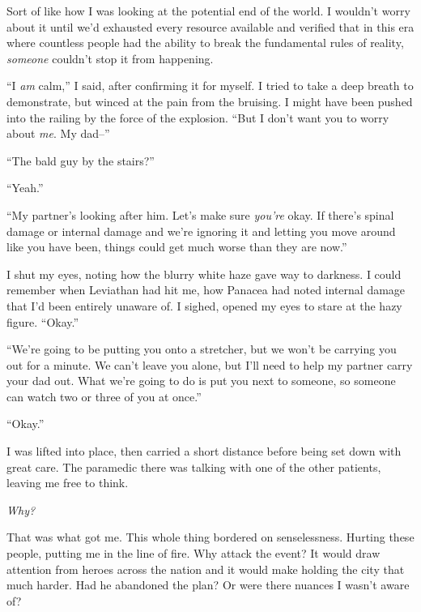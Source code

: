 Sort of like how I was looking at the potential end of the world.  I wouldn't worry about it until we'd exhausted every resource available and verified that in this era where countless people had the ability to break the fundamental rules of reality, \emph{someone} couldn't stop it from happening.



``I \emph{am} calm,'' I said, after confirming it for myself.  I tried to take a deep breath to demonstrate, but winced at the pain from the bruising.  I might have been pushed into the railing by the force of the explosion.  ``But I don't want you to worry about \emph{me}.  My dad--''



``The bald guy by the stairs?''



``Yeah.''



``My partner's looking after him.  Let's make sure \emph{you're} okay.  If there's spinal damage or internal damage and we're ignoring it and letting you move around like you have been, things could get much worse than they are now.''



I shut my eyes, noting how the blurry white haze gave way to darkness.  I could remember when Leviathan had hit me, how Panacea had noted internal damage that I'd been entirely unaware of.  I sighed, opened my eyes to stare at the hazy figure.  ``Okay.''



``We're going to be putting you onto a stretcher, but we won't be carrying you out for a minute.  We can't leave you alone, but I'll need to help my partner carry your dad out.  What we're going to do is put you next to someone, so someone can watch two or three of you at once.''



``Okay.''



I was lifted into place, then carried a short distance before being set down with great care.  The paramedic there was talking with one of the other patients, leaving me free to think.



\emph{Why?}



That was what got me.  This whole thing bordered on senselessness.  Hurting these people, putting me in the line of fire.  Why attack the event?  It would draw attention from heroes across the nation and it would make holding the city that much harder.  Had he abandoned the plan?  Or were there nuances I wasn't aware of?



